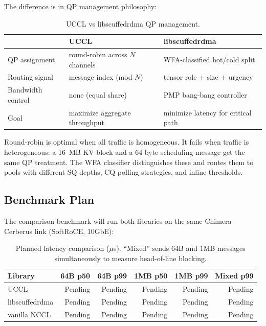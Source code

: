 \documentclass[11pt,letterpaper]{article}
\begin{document}
The difference is in QP management philosophy:

\begin{table}[ht]
\centering\small
\begin{tabular}{lll}
\toprule
& \textbf{UCCL} & \textbf{libscuffedrdma} \\
\midrule
QP assignment & round-robin across $N$ channels & WFA-classified hot/cold split \\
Routing signal & message index (mod $N$) & tensor role + size + urgency \\
Bandwidth control & none (equal share) & PMP bang-bang controller \\
Goal & maximize aggregate throughput & minimize latency for critical path \\
\bottomrule
\end{tabular}
\caption{UCCL vs libscuffedrdma QP management.}
\label{tab:uccl_vs_scuffed}
\end{table}

Round-robin is optimal when all traffic is homogeneous. It fails when traffic is heterogeneous: a 16~MB KV block and a 64-byte scheduling message get the same QP treatment. The WFA classifier distinguishes these and routes them to pools with different SQ depths, CQ polling strategies, and inline thresholds.

\subsection{Benchmark Plan}

The comparison benchmark will run both libraries on the same Chimera--Cerberus link (SoftRoCE, 10GbE):

\begin{table}[ht]
\centering\small
\begin{tabular}{lrrrrr}
\toprule
\textbf{Library} & \textbf{64B p50} & \textbf{64B p99} & \textbf{1MB p50} & \textbf{1MB p99} & \textbf{Mixed p99} \\
\midrule
UCCL & Pending & Pending & Pending & Pending & Pending \\
libscuffedrdma & Pending & Pending & Pending & Pending & Pending \\
vanilla NCCL & Pending & Pending & Pending & Pending & Pending \\
\bottomrule
\end{tabular}
\caption{Planned latency comparison ($\mu$s). ``Mixed'' sends 64B and 1MB messages simultaneously to measure head-of-line blocking.}
\label{tab:uccl_benchmark}
\end{table}
\end{document}
